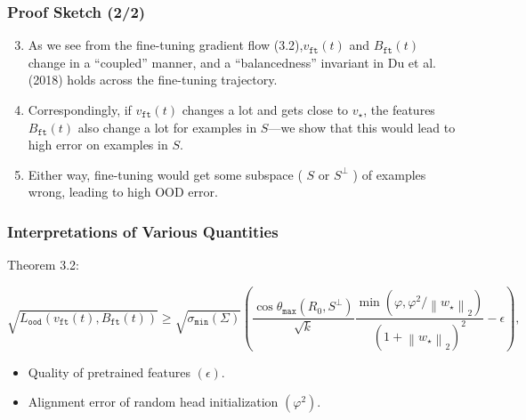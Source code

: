 \documentclass[16pt,aspectratio=169]{beamer}
\begin{document}
\begin{frame}
    \frametitle{Proof Sketch (2/2)}

    \begin{enumerate}
        \setcounter{enumi}{2}
        \item As we see from the fine-tuning gradient flow (3.2),$v_{\mathtt{ft}}(t)$ and $B_{\mathtt{ft}}(t)$ change in a ``coupled'' manner, and a ``balancedness'' invariant in Du et al. (2018) holds across the fine-tuning trajectory.
        \item Correspondingly, if $v_{\mathtt{ft}}(t)$ changes a lot and gets close to $v_{\star}$, the features $B_{\mathtt{ft}}(t)$ also change a lot for examples in $S$---we show that this would lead to high error on examples in $S$.
        \item Either way, fine-tuning would get some subspace ( $S$ or $S^{\perp}$ ) of examples wrong, leading to high OOD error.
    \end{enumerate}

\end{frame}

\begin{frame}
    \frametitle{Interpretations of Various Quantities}

    Theorem 3.2:

    $$
    \sqrt{L_{\mathtt{ood}}\left(v_{\mathtt{ft}}(t), B_{\mathtt{ft}}(t)\right)} \geq \sqrt{\sigma_{\mathtt{min}}(\Sigma)}\left(\frac{\cos \theta_{\mathtt{max}}\left(R_0, S^{\perp}\right)}{\sqrt{k}} \frac{\min \left(\varphi, \varphi^2 /\left\|w_{\star}\right\|_2\right)}{\left(1+\left\|w_{\star}\right\|_2\right)^2}-\epsilon\right),
    $$

    \begin{itemize}
        \item Quality of pretrained features $(\epsilon)$.
        \item Alignment error of random head initialization $\left(\varphi^2\right)$. 
    \end{itemize}

\end{frame}
\end{document}

